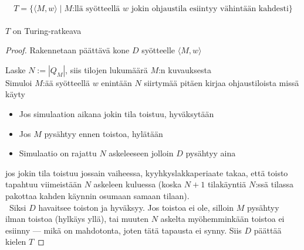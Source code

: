 \documentclass[12pt,a4paper]{article}
\begin{document}
\bigskip





\[
T=\{\langle M,w\rangle \mid \text{$M$:llä syötteellä $w$ jokin ohjaustila esiintyy vähintään kahdesti}\}
\]
\\


$T$ on Turing-ratkeava \\

\begin{proof}
Rakennetaan päättävä kone $D$ syötteelle $\langle M,w\rangle$

Laske $N:=|Q_M|$, siis tilojen lukumäärä $M$:n kuvauksesta\\
Simuloi $M$:ää syötteellä $w$
enintään $N$ siirtymää pitäen kirjaa ohjaustiloista missä käyty

\begin{itemize}
\item Jos simulaation aikana jokin tila toistuu, hyväksytään
\item Jos $M$ pysähtyy ennen toistoa, hylätään
\item Simulaatio on rajattu $N$ askeleeseen jolloin $D$ pysähtyy aina
\end{itemize}

jos jokin tila toistuu jossain vaiheessa, kyyhkyslakkaperiaate
takaa, että toisto tapahtuu viimeistään $N$ askeleen kuluessa 
(koska $N+1$ tilakäyntiä $N$:ssä tilassa pakottaa kahden käynnin 
osumaan samaan tilaan). \\

\rightarrow \, Siksi $D$ havaitsee toiston ja hyväksyy.
Jos toistoa ei ole, silloin $M$ pysähtyy ilman toistoa 
(hylkäys yllä), tai muuten $N$ askelta myöhemminkään toistoa 
ei esiinny — mikä on mahdotonta, joten tätä tapausta ei synny. 
Siis $D$ päättää kielen $T$
\end{proof}
\end{document}

